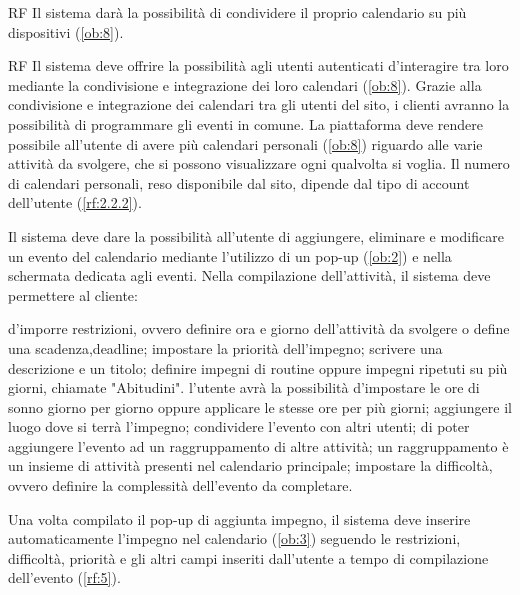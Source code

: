 \begin{listaPersonale}{RF}
	 Il sistema darà la possibilità di condividere il proprio calendario su più dispositivi (\ref{ob:8}).

	\begin{listaPersonale2}{RF}
		 Il sistema deve offrire la possibilità agli utenti autenticati d'interagire tra loro mediante la condivisione e integrazione dei loro calendari (\ref{ob:8}). Grazie alla condivisione e integrazione dei calendari tra gli utenti del sito, i clienti avranno la possibilità di programmare gli eventi in comune.
		 La piattaforma deve rendere possibile all’utente di avere più calendari personali (\ref{ob:8}) riguardo alle varie attività da svolgere, che si possono visualizzare ogni qualvolta si voglia. Il numero di calendari personali, reso disponibile dal sito, dipende dal tipo di account dell’utente (\ref{rf:2.2.2}).
	\end{listaPersonale2}

	 Il sistema deve dare la possibilità all'utente di aggiungere, eliminare e modificare un evento del calendario mediante l'utilizzo di un pop-up (\ref{ob:2}) e nella schermata dedicata agli eventi. Nella compilazione dell'attività, il sistema deve permettere al cliente:
	\begin{listaPersonale2}{}
		 d'imporre restrizioni, ovvero definire ora e giorno dell'attività da svolgere o define una scadenza,deadline;
		 impostare la priorità dell'impegno;
		 scrivere una descrizione e un titolo;
		 definire impegni di routine oppure impegni ripetuti su più giorni, chiamate "Abitudini".
		 l'utente avrà la possibilità d'impostare le ore di sonno giorno per giorno oppure applicare le stesse ore per più giorni;
		 aggiungere il luogo dove si terrà l'impegno;
		 condividere l'evento con altri utenti;
		 di poter aggiungere l'evento ad un raggruppamento di altre attività; un raggruppamento è un insieme di attività presenti nel calendario principale;
		 impostare la difficoltà, ovvero definire la complessità dell'evento da completare.
	\end{listaPersonale2}


	 Una volta compilato il pop-up di aggiunta impegno, il sistema deve inserire automaticamente l'impegno nel calendario (\ref{ob:3}) seguendo le restrizioni, difficoltà, priorità e gli altri campi inseriti dall'utente a tempo di compilazione dell'evento (\ref{rf:5}).


\end{listaPersonale}
